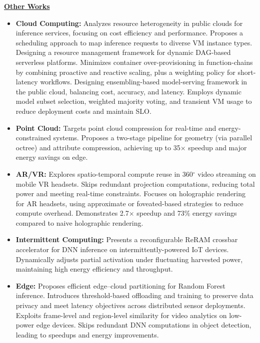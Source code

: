 \documentclass[letterpaper,11pt]{article}
\begin{document}
\textbf{\underline{Other Works}}
\begin{itemize}
    \item \textbf{Cloud Computing:} Analyzes resource heterogeneity in public clouds for inference services, focusing on cost efficiency and performance. Proposes a scheduling approach to map inference requests to diverse VM instance types.
    Designing a resource management framework for dynamic DAG-based serverless platforms. Minimizes container over-provisioning in function-chains by combining proactive and reactive scaling, plus a weighting policy for short-latency workflows.
    Designing ensembling-based model-serving framework in the public cloud, balancing cost, accuracy, and latency. Employs dynamic model subset selection, weighted majority voting, and transient VM usage to reduce deployment costs and maintain SLO.

\item \textbf{Point Cloud:} Targets point cloud compression for real-time and energy-constrained systems. Proposes a two-stage pipeline for geometry (via parallel octree) and attribute compression, achieving up to 35$\times$ speedup and major energy savings on edge. 

\item \textbf{AR/VR:} Explores spatio-temporal compute reuse in 360$^\circ$ video streaming on mobile VR headsets. Skips redundant projection computations, reducing total power and meeting real-time constraints.
Focuses on holographic rendering for AR headsets, using approximate or foveated-based strategies to reduce compute overhead. Demonstrates 2.7$\times$ speedup and 73\% energy savings compared to naive holographic rendering.


\item \textbf{Intermittent Computing:} Presents a reconfigurable ReRAM crossbar accelerator for DNN inference on intermittently-powered IoT devices. Dynamically adjusts partial activation under fluctuating harvested power, maintaining high energy efficiency and throughput.

\item \textbf{Edge:} Proposes efficient edge–cloud partitioning for Random Forest inference. Introduces threshold-based offloading and training to preserve data privacy and meet latency objectives across distributed sensor deployments. Exploits frame-level and region-level similarity for video analytics on low-power edge devices. Skips redundant DNN computations in object detection, leading to speedups and energy improvements.
     
\end{itemize}
\end{document}
